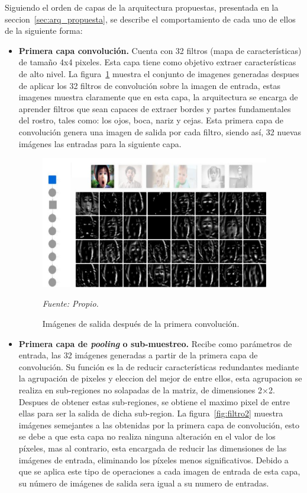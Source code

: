 Siguiendo el orden de capas de la arquitectura propuestas, presentada en la seccion~\ref{sec:arq_propuesta}, se describe el comportamiento de cada uno de ellos de la siguiente forma: 
\begin{itemize}
\item
{
\textbf{Primera capa convolución.} Cuenta con 32 filtros (mapa de características) de tamaño 4x4 pixeles. Esta capa tiene como objetivo extraer características de alto nivel. La figura~\ref{fig:filtro1} muestra el conjunto de imagenes generadas despues de aplicar los 32 filtros de convolución sobre la imagen de entrada, estas imagenes muestra claramente que en esta capa, la arquitectura se encarga de aprender filtros que sean capaces de extraer bordes y partes fundamentales del rostro, tales como: los ojos, boca, nariz y cejas. Esta primera capa de convolución genera una imagen de salida por cada filtro, siendo así, 32 nuevas imágenes las entradas para la siguiente capa. 

\begin{figure}[H]
		\centering
		\includegraphics[width=100mm]{Imagenes/filtro1.png}
		\caption{Imágenes de salida después de la primera convolución.}
		\vspace{0.15cm}
		\textit{Fuente: Propio.}
		\label{fig:filtro1}
\end{figure}
}

\item
{
\textbf{Primera capa de \textit{pooling} o sub-muestreo.} Recibe como parámetros de entrada, las 32 imágenes generadas a partir de la primera capa de convolución. Su función es la de reducir características redundantes mediante la agrupación de pixeles y eleccion del mejor de entre ellos, esta agrupacion se realiza en sub-regiones no solapadas de la matriz, de dimensiones 2$\times$2. Despues de obtener estas sub-regiones, se obtiene el maximo pixel de entre ellas para ser la salida de dicha sub-region. La figura~\ref{fig:filtro2} muestra imágenes semejantes a las obtenidas por la primera capa de convolución, esto se debe a que esta capa no realiza ninguna alteración en el valor de los píxeles, mas al contrario, esta encargada de reducir las dimensiones de las imágenes de entrada, eliminando los píxeles menos significativos. Debido a que se aplica este tipo de operaciones a cada imagen de entrada de esta capa, su número de imágenes de salida sera igual a su numero de entradas.

}
\end{itemize}
